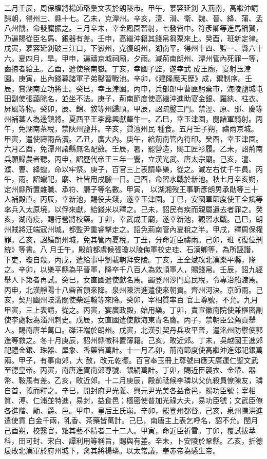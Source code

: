 \begin{pinyinscope}
 二月壬辰，周保權將楊師璠梟文表於朗陵市。甲午，慕容延釗
 入荊南，高繼沖請歸朝，得州三、縣十七。乙未，克潭州。辛亥，澶、滑、衛、魏、晉、絳、蒲、孟八州饑，命發廩振之。三月辛未，幸金鳳園習射，七發皆中。符彥卿等進馬稱賀，乃遍賜從臣名馬、銀器有差。壬申，高繼沖籍其錢帛芻粟來上。癸酉，班新定律。戊寅，慕容延釗破三江口，下嶽州，克復朗州，湖南平。得州十四、監一、縣六十六。夏四月，旱。甲申，遍禱京城祠廟，夕雨。減荊南朗州、潭州管內死罪一等，鹵掠者給主。乙酉，遣使祭南嶽。丁亥，幸國子監，遂幸武
 成王廟，宴射玉津園。庚寅，出內錢募諸軍子弟鑿習戰池。辛卯，《建隆應天歷》成，禦制序。壬辰，賞湖南立功將士。癸巳，幸玉津園。丙申，兵部郎中曹匪躬棄市，海陵鹽城屯田副使張藹除名，並坐不法。庚子，荊南節度使高繼沖進助宴金銀、羅紈、柱衣、屏風等物。癸卯，辰、錦、敘等州歸順。甲辰，詔疏鑿三門。禁涇、原、邠、慶等州補蕃人為邊鎮將。夏西平王李彞興獻犛牛一。乙巳，幸玉津園，閱諸軍騎射。丙午，免湖南茶稅，禁陜州鹽井。辛亥，貸澶州民
 種食。五月壬子朔，禱雨京城。甲寅，遣使禱雨岳瀆。乙丑，廣大內。庚午，給荊南管內符印。癸酉，幸玉津園。六月乙酉，免潭州諸縣無名配斂。壬辰，暑，罷營造，賜工匠衫履。乙未，詔荊南兵願歸農者聽。丙申，詔歷代帝王三年一饗，立漢光武、唐太宗廟。己亥，澶、濮、曹、絳蝗，命以牢祭。庚子，百官三上表請舉樂，從之。減左右仗千牛員。丙午，雨。詔蠟祀，廟、社皆用戌臘一日。己酉，命習水戰於新池。秋七月辛亥朔，定州縣所置雜職、承符、廳子等名數。甲寅，
 以湖湘歿王事靳彥朗男承勛等三十人補殿直。丙辰，幸新池，賜役夫錢，遂幸玉津園。丁巳，安國軍節度使王全斌等率兵入太原境，以俘來獻，給錢米以釋之。己未，詔民有疾而親屬遺去者罪之。癸亥，湖南疫，賜行營將校藥。丁卯，幸武成王廟，遂幸新池，觀習水戰。己巳，朗州賊將汪端寇州城，都監尹重睿擊走之。詔免荊南管內夏稅之半。甲戌，釋周保權罪。乙亥，詔繕朗州城，免其管內夏稅。丁丑，分命近臣禱雨。己卯，班《復位刑統》等書。八
 月壬午，殿前都虞候張瓊以陵侮軍校史珪、石漢卿等，為所誣譖，下吏，瓊自殺。丙戌，遣給事中劉載朝拜安陵。丁亥，王全斌攻北漢樂平縣，降之。辛卯，以樂平縣為平晉軍，降卒千八百人為效順軍人，賜錢帛。壬辰，詔九經舉人下第者再試。癸巳，女直國遣使獻名馬。蠲登州沙門島民稅，令專治船渡馬。丙申，北漢靜陽十八砦首領來降。泉州陳洪進遣使來朝貢。齊州河決。京師雨。己亥，契丹幽州岐溝關使柴廷翰等來降。癸卯，宰相質率百
 官上尊號，不允。九月甲寅，三上表請，從之。丙寅，宴廣政殿，始用樂。丁卯，責宣徽南院使兼樞密副使李處耘為淄州刺史。戊辰，女直國遣使獻海東青名鷹。丙子，禁朝臣公薦貢舉人。賜南唐羊萬口。磔汪端於朗州。戊寅，北漢引契丹兵攻平晉，遣洺州防禦使郭進等救之。冬十月庚辰，詔州縣徵科置簿籍。己亥，畋近郊。丁未，吳越國王進郊祀禮金銀、珠器、犀象、香藥皆萬計。十一月乙卯，荊南節度使高繼沖進郊祀銀萬兩。甲子，有事南郊，大
 赦，改元乾德。百官奉玉冊上尊號曰應天廣運仁聖文武至德皇帝。丙寅，南唐進賀南郊尊號、銀絹萬計。丁卯，賜近臣襲衣、金帶、器幣、鞍馬有差。乙亥，畋近郊。十二月庚辰，殿前祗候李璘以父仇殺員僚陳友，璘自首，義而釋之。辛巳，開封府尹光義、興元尹光美各益食邑，賜功臣號；宰相質、溥、仁浦並特進，易封，益食邑；樞密使普加光祿大夫，易功臣號；文武臣僚各進階、勛、爵、邑。甲申，皇后王氏崩。辛卯，罷登州都督。己亥，泉州陳洪進遣使貢
 白金千兩，乳香、茶藥皆萬計。己巳，南唐主上表乞呼名，詔不允。閏月己酉朔，校醫官，黜其藝不精者二十二人。甲寅，命近臣祈雪。丁卯，覆試拔萃科，田可封、宋白、譚利用等稱旨，賜與有差。辛未，卜安陵於鞏縣。乙亥，折德扆敗北漢軍於府州城下，禽其將楊璘。以太常議，奉赤帝為感生帝。




\end{pinyinscope}
